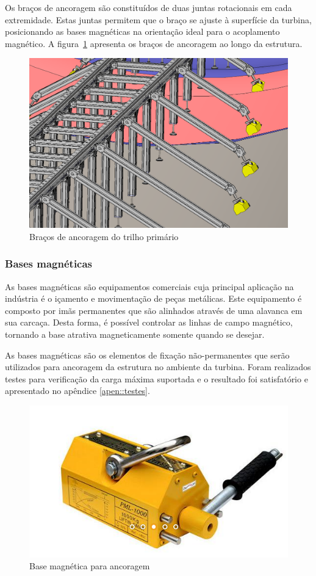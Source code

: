 Os braços de ancoragem são constituídos de duas juntas rotacionais em cada
extremidade. Estas juntas permitem que o braço se ajuste à superfície da
turbina, posicionando as bases magnéticas na orientação ideal para o acoplamento
magnético. A figura~\ref{fig::ancoragem} apresenta os braços de ancoragem ao
longo da estrutura.

\begin{figure}[h!]
	\centering
	\includegraphics[width=0.7\columnwidth]{method/figs/construcao/ancoragem}
	\caption{Braços de ancoragem do trilho primário}
    \label{fig::ancoragem}
\end{figure}

\subsubsection{Bases magnéticas}

As bases magnéticas são equipamentos comerciais cuja principal aplicação na
indústria é o içamento e movimentação de peças metálicas. Este equipamento é
composto por imãs permanentes que são alinhados através de uma alavanca em sua
carcaça. Desta forma, é possível controlar as linhas de campo magnético,
tornando a base atrativa magneticamente somente quando se desejar.

As bases magnéticas são os elementos de fixação não-permanentes que serão
utilizados para ancoragem da estrutura no ambiente da turbina. Foram realizados
testes para verificação da carga máxima suportada e o resultado foi
satisfatório e apresentado no apêndice \ref{apen::testes}.



\begin{figure}[h!]
	\centering
	\includegraphics[width=0.5\columnwidth]{method/figs/construcao/base_magnetica}
	\caption{Base magnética para ancoragem}
    \label{fig::base_magnetica}
\end{figure}


